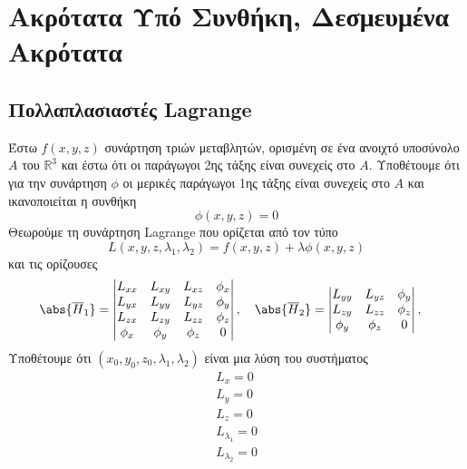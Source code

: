 \chapter{Ακρότατα Υπό Συνθήκη, Δεσμευμένα Ακρότατα}

\section{Πολλαπλασιαστές Lagrange}

\begin{thm}
    Έστω $ f(x,y,z) $ συνάρτηση τριών μεταβλητών, ορισμένη σε ένα ανοιχτό 
    υποσύνολο $A$ του $ \mathbb{R}^{3} $ και έστω ότι οι παράγωγοι 2ης τάξης είναι 
    συνεχείς στο $A$. Υποθέτουμε ότι για την συνάρτηση $ \phi $ οι μερικές παράγωγοι 
    1ης τάξης είναι συνεχείς στο $A$ και ικανοποιείται η συνθήκη 
    \begin{equation}
        \label{eq:constr1}
        \phi (x,y,z) = 0
    \end{equation}
    Θεωρούμε τη συνάρτηση Lagrange που ορίζεται από τον τύπο
    \[
        L(x,y,z, \lambda _{1}, \lambda _{2}) = f(x,y,z) + \lambda \phi (x,y,z) 
    \] 
    και τις ορίζουσες
    \[
        \abs{\overline{H}_{1}} = 
        \begin{vmatrix}
            L_{xx} & L_{xy} & L_{xz} & {\phi}_{x} \\
            L_{yx} & L_{yy} & L_{yz} & {\phi}_{y} \\
            L_{zx} & L_{zy} & L_{zz} & {\phi}_{z} \\
            {\phi}_{x} & {\phi}_{y} & {\phi}_{z} & 0
        \end{vmatrix}, \quad 
        \abs{\overline{H}_{2}} = 
        \begin{vmatrix}
            L_{yy} & L_{yz} & {\phi}_{y} \\
            L_{zy} & L_{zz} & {\phi}_{z} \\
            {\phi}_{y} & {\phi}_{z} & 0
        \end{vmatrix}, \quad 
    \] 
    Υποθέτουμε ότι $ (x_{0}, y_{0}, z_{0}, \lambda _{1}, \lambda _{2}) $ είναι μια 
    λύση του συστήματος 
    \[
        \left.
            \begin{matrix}
                L_{x} = 0 \\
                L_{y} = 0 \\
                L_{z} = 0 \\
                L_{\lambda _{1}} = 0 \\
                L_{\lambda _{2}} = 0 

\end{matrix}\]
\end{thm}
